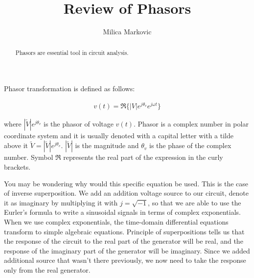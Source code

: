 \documentclass{ximera}
\title{Review of Phasors}
\author{Milica Markovic}
\begin{document}
  
\begin{abstract}  
Phasors are essential tool in circuit analysis.
\end{abstract}  
\maketitle    


\begin{definition}
Phasor transformation is defined as follows:

\begin{eqnarray}
v(t)=\Re\{|V|e^{j\theta_v} e^{j \omega t}\}
\end{eqnarray}

where $|\widetilde{V}|e^{j\theta_v}$ is the phasor of voltage $v(t)$. Phasor is a complex number in polar coordinate system and it is usually denoted with a capital letter with a tilde above it $\widetilde{V} = |\widetilde{V}|e^{j\theta_v}$. $ |\widetilde{V}|$ is the magnitude and $\theta_v$ is the phase of the complex number. Symbol $\Re$ represents the real part of the expression in the curly brackets. 

\end{definition}

You may be wondering why would this specific equation be used. This is the case of inverse superposition. We add an addition voltage source to our circuit, denote it as imaginary by multiplying it with $j=\sqrt{-1}$, so that we are able to use the Eurler's formula to write a sinusoidal signals in terms of complex exponentials. When we use complex exponentials, the time-domain differential equations transform to simple algebraic equations. Principle of superpositions tells us that the response of the circuit to the real part of the generator will be real, and the response of the imaginary part of the generator will be imaginary. Since we added additional source that wasn't there previously, we now need to take the response only from the real generator.
\end{document}
